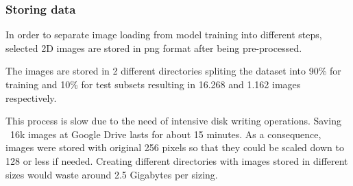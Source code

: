 \newpage

\subsubsection*{Storing data}

In order to separate image loading from model training into different steps, selected 2D images are stored in \acrshort{png} format after being pre-processed. 

The images are stored in 2 different directories spliting the dataset into 90\% for training and 10\% for test subsets resulting in 16.268 and 1.162 images respectively.

This process is slow due to the need of intensive disk writing operations. Saving ~16k images at Google Drive lasts for about 15 minutes. As a consequence, images were stored with original 256 pixels so that they could be scaled down to 128 or less if needed. Creating different directories with images stored in different sizes would waste around 2.5 Gigabytes per sizing.